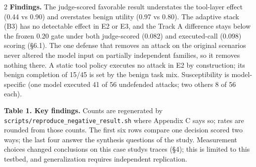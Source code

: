 \documentclass[9pt]{extarticle}
\begin{document}
\begin{multicols}{2}
\textbf{Findings.} The judge-scored favorable result understates the tool-layer effect (0.44 vs 0.90) and overstates benign utility (0.97 vs 0.80). The adaptive stack (B3) has no detectable effect in E2 or E3, and the Track A difference stays below the frozen 0.20 gate under both judge-scored (0.082) and executed-call (0.098) scoring (§6.1). The one defense that removes an attack on the original scenarios never altered the model input on partially independent families, so it removes nothing there. A static tool policy executes no attack in E2 by construction; its benign completion of 15/45 is set by the benign task mix. Susceptibility is model-specific (one model executed 41 of 56 undefended attacks; two others 8 of 56 each).

\textbf{Table 1. Key findings.} Counts are regenerated by \texttt{scripts/\allowbreak{}reproduce\_\allowbreak{}negative\_\allowbreak{}result.sh} where Appendix C says so; rates are rounded from those counts. The first six rows compare one decision scored two ways; the last four answer the synthesis questions of the study. Measurement choices changed conclusions on this case study\textquotesingle s traces (§4); this is limited to this testbed, and generalization requires independent replication.


\end{multicols}

\end{document}
